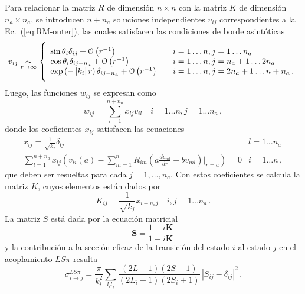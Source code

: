 Para relacionar la matriz $R$ de dimensión $n\times n$ con la matriz 
$K$ de dimensión $n_a\times n_a$, se introducen $n+n_a$ soluciones 
independientes $v_{ij}$ correspondientes a la Ec.~(\ref{eq:RM-outer}), 
las cuales satisfacen las condiciones de borde asintóticas
\begin{equation}
v_{ij}\underset{r \rightarrow \infty}{\sim} \vast\{
\begin{array}{ll}
\sin\theta_i\delta_{ij}+\mathcal{O}\left(r^{-1}\right) 
&\quad i=1\ldots n,j=1\ldots n_a \\
\cos\theta_{i}\delta_{ij-n_a}+\mathcal{O}\left(r^{-1}\right) 
&\quad i=1\ldots n,j=n_a+1\ldots 2n_a \\
\exp\left(-\left|k_i\right|r\right)\delta_{ij-n_a}
+\mathcal{O}\left(r^{-1}\right)
&\quad i=1\ldots n,j=2n_a+1\ldots n+n_a\,.
\end{array}
\end{equation}
Luego, las funciones $w_{ij}$ se expresan como
\begin{equation}
w_{ij}=\sum_{l=1}^{n+n_a}x_{lj}v_{il}\quad i=1 \ldots n, j=1 \ldots n_a\,,
\end{equation}
donde los coeficientes $x_{lj}$ satisfacen las ecuaciones
\begin{equation}
\begin{array}{cl}
x_{lj}=\frac{1}{\sqrt{k_j}} \delta_{lj} & l=1 \ldots n_a \\
\sum_{l=1}^{n+n_a} x_{lj}\left(v_{ii}(a)-\sum_{m=1}^n R_{im}
\left(a\frac{d v_{ml}}{dr}-b v_{ml}\right)\bigg|_{r=a}\right)=0 & 
i=1 \ldots n\,,
\end{array}
\end{equation}
que deben ser resueltas para cada $j=1,\dots,n_a$. Con estos 
coeficientes se calcula la matriz $K$, cuyos elementos están dados por
\begin{equation}
K_{ij}=\frac{1}{\sqrt{k_j}} x_{i+n_aj} \quad i,j=1 \ldots n_a\,.
\end{equation}
La matriz $S$ está dada por la ecuación matricial
\begin{equation}
\mathbf{S}=\frac{1+i \mathbf{K}}{1-i \mathbf{K}}\,
\end{equation}
y la contribución a la sección eficaz de la transición del estado $i$ 
al estado $j$ en el acoplamiento $LS\pi$ resulta
\begin{equation}
\sigma_{i \rightarrow j}^{LS\pi}=\frac{\pi}{k_i^2} \sum_{l_il_j} 
\frac{(2L+1)(2S+1)}{\left(2L_i+1\right)\left(2S_i+1\right)}\,
\left|S_{ij}-\delta_{ij}\right|^{2}\,.
\end{equation}

